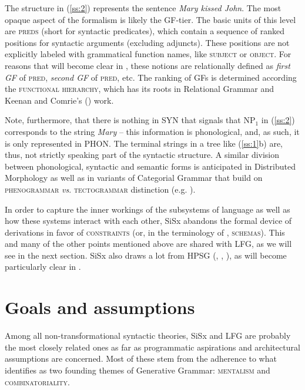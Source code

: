 \documentclass[output=paper,hidelinks]{langscibook}
\begin{document}
The structure in (\ref{ss:2}) represents the sentence \textit{Mary kissed John}. The most opaque aspect of the formalism is likely the GF-tier. The basic units of this level are \textsc{preds} (short for syntactic predicates), which contain a sequence of ranked positions for syntactic arguments (excluding adjuncts). These positions are not explicitly labeled with grammatical function names, like \textsc{subject} or \textsc{object}. For reasons that will become clear in , these notions are relationally defined as \textit{first GF} of \textsc{pred}, \textit{second GF} of \textsc{pred}, etc. The ranking of GFs is determined according the \textsc{functional hierarchy}, which has its roots in Relational Grammar \citep{perlmutter1977toward, perlmutter1983some} and Keenan and Comrie's (\citeyear{keenan1977noun}) work.

Note, furthermore, that there is nothing in SYN that signals that NP$_{1}$ in (\ref{ss:2}) corresponds to the string \textit{Mary} -- this information is phonological, and, as such, it is only represented in PHON. The terminal strings in a tree like (\ref{ss:1}b) are, thus, not strictly speaking part of the syntactic structure. A similar division between phonological, syntactic and semantic forms is anticipated in Distributed Morphology \citep{halle1994some, marantz1997no} as well as in variants of Categorial Grammar that build on  \textsc{phenogrammar} \textit{vs}. \textsc{tectogrammar} distinction (e.g. \citealt{oehrle1994term-labeled, mihalicek2012distinguishing}).

In order to capture the inner workings of the subsystems of language as well as how these systems  interact with each other, SiSx abandons the formal device of derivations in favor of \textsc{constraints} (or, in the terminology of \citet{jackendoff2020texture}, \textsc{schemas}). This and many of the other points mentioned above are shared with LFG, as we will see in the next section. SiSx also draws a lot from HPSG (\citealt{pollard1994head-driven}, \citealt{mue:etal:21:ed}, ), as will become particularly clear in .




\section{Goals and assumptions}\label{ss:sec2}

Among all non-transformational syntactic theories, SiSx and LFG are probably the most closely related ones as far as  programmatic aspirations and architectural assumptions are concerned. Most of these stem from the adherence to what \citet[chapter~2]{jackendoff2007language} identifies as two founding themes of Generative Grammar: \textsc{mentalism} and \textsc{combinatoriality}.%
\end{document}
